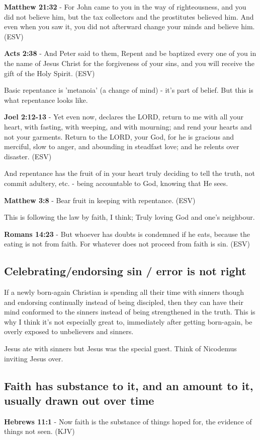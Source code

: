 \documentclass[11pt]{article}
\begin{document}
\textbf{Matthew 21:32} - For John came to you in the way of righteousness, and you did not believe him, but the tax collectors and the prostitutes believed him. And even when you saw it, you did not afterward change your minds and believe him. (ESV)

\textbf{Acts 2:38} - And Peter said to them, Repent and be baptized every one of you in the name of Jesus Christ for the forgiveness of your sins, and you will receive the gift of the Holy Spirit. (ESV)

Basic repentance is 'metanoia' (a change of mind) - it's part of belief.
But this is what repentance looks like.

\textbf{Joel 2:12-13} - Yet even now, declares the LORD, return to me with all your heart, with fasting, with weeping, and with mourning; and rend your hearts and not your garments. Return to the LORD, your God, for he is gracious and merciful, slow to anger, and abounding in steadfast love; and he relents over disaster. (ESV)

And repentance has the fruit of in your heart truly deciding to tell the truth, not commit adultery, etc. - being accountable to God, knowing that He sees.

\textbf{Matthew 3:8} - Bear fruit in keeping with repentance.  (ESV)

This is following the law by faith, I think; Truly loving God and one's neighbour.

\textbf{Romans 14:23} - But whoever has doubts is condemned if he eats, because the eating is not from faith. For whatever does not proceed from faith is sin. (ESV)

\subsection{Celebrating/endorsing sin / error is not right}
\label{sec:orgec083bd}

If a newly born-again Christian is spending all their time with sinners though and endorsing continually instead of being discipled, then they can
have their mind conformed to the sinners instead of being strengthened in the truth. This is why I think it's not especially great to, immediately after getting born-again,
be overly exposed to unbelievers and sinners.

Jesus ate with sinners but Jesus was the special guest. Think of Nicodemus inviting Jesus over.

\subsection{Faith has substance to it, and an amount to it, usually drawn out over time}
\label{sec:org5d34c85}
\textbf{Hebrews 11:1} - Now faith is the substance of things hoped for, the evidence of things not seen. (KJV)
\end{document}
